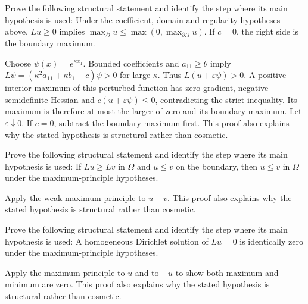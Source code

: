 \begin{problem}\label{prob:iii27-problem-09}
Prove the following structural statement and identify the step where its main hypothesis is used: Under the coefficient, domain and regularity hypotheses above, $Lu\ge0$ implies $\max_{\overline\Omega}u\le\max(0,\max_{\partial\Omega}u)$. If $c=0$, the right side is the boundary maximum.
\end{problem}
\begin{solution}
Choose $\psi(x)=e^{\kappa x_1}$. Bounded coefficients and $a_{11}\ge\theta$ imply $L\psi=(\kappa^2a_{11}+\kappa b_1+c)\psi>0$ for large $\kappa$. Thus $L(u+\varepsilon\psi)>0$. A positive interior maximum of this perturbed function has zero gradient, negative semidefinite Hessian and $c(u+\varepsilon\psi)\le0$, contradicting the strict inequality. Its maximum is therefore at most the larger of zero and its boundary maximum. Let $\varepsilon\downarrow0$. If $c=0$, subtract the boundary maximum first. This proof also explains why the stated hypothesis is structural rather than cosmetic.
\end{solution}

\begin{problem}\label{prob:iii27-problem-10}
Prove the following structural statement and identify the step where its main hypothesis is used: If $Lu\ge Lv$ in $\Omega$ and $u\le v$ on the boundary, then $u\le v$ in $\Omega$ under the maximum-principle hypotheses.
\end{problem}
\begin{solution}
Apply the weak maximum principle to $u-v$. This proof also explains why the stated hypothesis is structural rather than cosmetic.
\end{solution}

\begin{problem}\label{prob:iii27-problem-11}
Prove the following structural statement and identify the step where its main hypothesis is used: A homogeneous Dirichlet solution of $Lu=0$ is identically zero under the maximum-principle hypotheses.
\end{problem}
\begin{solution}
Apply the maximum principle to $u$ and to $-u$ to show both maximum and minimum are zero. This proof also explains why the stated hypothesis is structural rather than cosmetic.
\end{solution}

